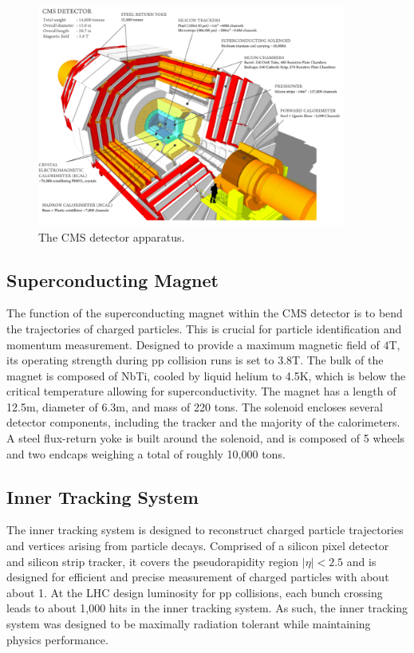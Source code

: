 \begin{figure}
  \centering
   \includegraphics[width=0.9\textwidth]{fig/experiment/detector/cms_about_detector.png}
	\caption{The CMS detector apparatus.}
	\label{fig:detector}
\end{figure}


\subsection{Superconducting Magnet}
The function of the superconducting magnet within the CMS detector is to bend the trajectories of charged particles. This is crucial for particle identification and momentum measurement. 
Designed to provide a maximum magnetic field of $4$\unit{T}, its operating strength during pp collision runs is set to $3.8$\unit{T}. The bulk of the magnet is composed of NbTi, cooled by 
liquid helium to 4.5K, which is below the critical temperature allowing for superconductivity. The magnet has a length of 12.5m, diameter of 6.3m, and mass of 220 tons. The solenoid encloses 
several detector components, including the tracker and the majority of the calorimeters. A steel flux-return yoke is built around the solenoid, and is composed of 5 wheels and two endcaps weighing 
a total of roughly 10,000 tons. 

\subsection{Inner Tracking System}
The inner tracking system is designed to reconstruct charged particle trajectories and vertices arising from particle decays. Comprised of a silicon pixel detector and silicon strip tracker, 
it covers the pseudorapidity region $|\eta| < 2.5$ and is designed for efficient and precise measurement of charged particles with \pt about about 1\GeV. 
At the LHC design luminosity for pp collisions, each bunch crossing leads to about 1,000 hits in the inner tracking system. As such, the inner tracking system was designed to be 
maximally radiation tolerant while maintaining physics performance. 

